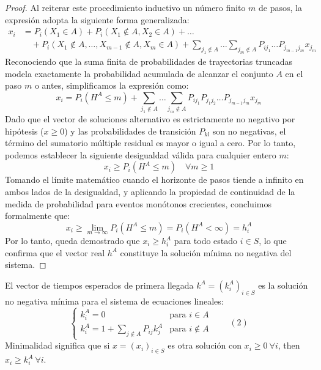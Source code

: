 \documentclass[10pt]{book}
\begin{document}
\begin{teo}
\begin{proof}
    \noindent
    Al reiterar este procedimiento inductivo un número finito $m$ de pasos, la expresión adopta la siguiente forma generalizada:
    \begin{align*}
        x_i &= P_i(X_1 \in A) + P_i(X_1 \notin A, X_2 \in A) + \dots \\
        &\quad + P_i(X_1 \notin A, \dots, X_{m-1} \notin A, X_m \in A) + \sum_{j_1 \notin A} \dots \sum_{j_m \notin A} P_{i j_1} \dots P_{j_{m-1} j_m} x_{j_m}
    \end{align*}
    Reconociendo que la suma finita de probabilidades de trayectorias truncadas modela exactamente la probabilidad acumulada de alcanzar el conjunto $A$ en el paso $m$ o antes, simplificamos la expresión como:
    \[
    x_i = P_i(H^A \leq m) + \sum_{j_1 \notin A} \dots \sum_{j_m \notin A} P_{i j_1} P_{j_1 j_2} \dots P_{j_{m-1} j_m} x_{j_m}
    \]
    Dado que el vector de soluciones alternativo es estrictamente no negativo por hipótesis ($x \geq 0$) y las probabilidades de transición $P_{kl}$ son no negativas, el término del sumatorio múltiple residual es mayor o igual a cero. Por lo tanto, podemos establecer la siguiente desigualdad válida para cualquier entero $m$:
    \[
    x_i \geq P_i(H^A \leq m) \quad \forall m \geq 1
    \]
    Tomando el límite matemático cuando el horizonte de pasos tiende a infinito en ambos lados de la desigualdad, y aplicando la propiedad de continuidad de la medida de probabilidad para eventos monótonos crecientes, concluimos formalmente que:
    \[
    x_i \geq \lim_{m \to \infty} P_i(H^A \leq m) = P_i(H^A < \infty) = h_i^A
    \]
    Por lo tanto, queda demostrado que $x_i \geq h_i^A$ para todo estado $i \in S$, lo que confirma que el vector real $h^A$ constituye la solución mínima no negativa del sistema.
\end{proof}
\end{teo}


\begin{teo}
    El vector de tiempos esperados de primera llegada $k^A = (k_i^A)_{i \in S}$ es la solución no negativa mínima para el sistema de ecuaciones lineales:
    \[
    \begin{cases} 
        k_i^A = 0 & \text{para } i \in A \\ 
        k_i^A = 1 + \sum\limits_{j \notin A} P_{ij} k_j^A & \text{para } i \notin A 
    \end{cases} \qquad (2)
    \]
    Minimalidad significa que si $x = (x_i)_{i \in S}$ es otra solución con $x_i \geq 0 \ \forall i$, then $x_i \geq k_i^A \ \forall i$.
\end{teo}
\end{document}
